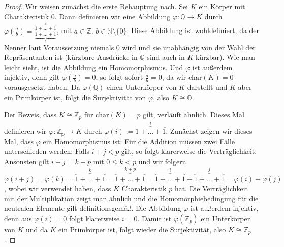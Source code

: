 \begin{proof}
    Wir weisen zunächst die erste Behauptung nach. Sei $K$ ein Körper mit Charakteristik $0$.
    Dann definieren wir eine Abbildung $\varphi:\mathbb{Q}\to K$ durch $\varphi(\frac{a}{b})=\frac{\overbrace{1+\ldots+1}^{a}}{\underbrace{1+\ldots+1}_{b}}$,
    mit $a\in \mathbb{Z}$, $b\in\mathbb{N}\setminus\{0\}$. Diese Abbildung ist wohldefiniert,
    da der Nenner laut Voraussetzung niemals $0$ wird und sie unabhängig von der Wahl der Repräsentanten ist
    (kürzbare Ausdrücke in $\mathbb{Q}$ sind auch in $K$ kürzbar).
    Wie man leicht sieht, ist die Abbildung ein Homomorphismus. Und $\varphi$ ist außerdem injektiv, denn gilt
    $\varphi(\frac{a}{b})=0$, so folgt sofort $\frac{a}{b}=0$, da wir $\mathrm{char}(K)=0$ vorausgesetzt haben.
    Da $\varphi(\mathbb{Q})$ einen Unterkörper von $K$ darstellt und $K$ aber ein Primkörper ist, folgt die Surjektivität von $\varphi$,
    also $K\cong \mathbb{Q}$.

    Der Beweis, dass $K\cong\mathbb{Z}_p$ für $\mathrm{char}(K)=p$ gilt, verläuft ähnlich.
    Dieses Mal definieren wir $\varphi:\mathbb{Z_p}\to K$ durch $\varphi(i):=\overbrace{1+\ldots+1}^{i}$.
    Zunächst zeigen wir dieses Mal, dass $\varphi$ ein Homomorphismus ist:
    Für die Addition müssen zwei Fälle unterschieden werden: Falls $i+j<p$ gilt, so folgt klarerweise die
    Verträglichkeit. Ansonsten gilt $i+j=k+p$ mit $0\le k< p$ und wir folgern 
    $\varphi(i+j)=\varphi(k)=\overbrace{1+\ldots+1}^{k}=\overbrace{1+\ldots+1}^{k+p}=\overbrace{1+\ldots+1}^{i}+\overbrace{1+\ldots+1}^{j}=\varphi(i)+\varphi(j)$,
    wobei wir verwendet haben, dass $K$ Charakteristik $p$ hat. Die Verträglichkeit mit der Multiplikation zeigt man ähnlich
    und die Homomorphiebedingung für die neutralen Elemente gilt definitionsgemäß. Die Abbildung
    $\varphi$ ist außerdem injektiv, denn aus $\varphi(i)=0$ folgt klarerweise $i=0$. Damit ist
    $\varphi(\mathbb{Z}_p)$ ein Unterkörper von $K$ und da $K$ ein Primkörper ist, folgt wieder die Surjektivität,
    also $K\cong \mathbb{Z}_p$.


\end{proof}